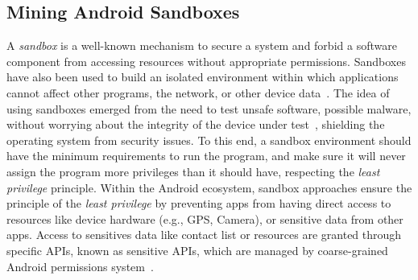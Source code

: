 \subsection{Mining Android Sandboxes}\label{sec:android-sandbox}

A \emph{sandbox}
is a well-known mechanism to secure a system and forbid a software component from accessing
resources without appropriate permissions. Sandboxes have also been used to build an isolated
environment within which applications cannot affect other programs, the network, or other device
data~\cite{DBLP:journals/peerj-cs/MaassSCS16}. The idea of using sandboxes emerged from the
need to test unsafe software, possible malware, without worrying about the integrity of the
device under test~\cite{DBLP:conf/esorics/BordoniCS17}, shielding the operating system from security issues.
To this end, a sandbox environment should have the minimum requirements to run the
program, and make sure it will never assign the program more privileges than it should have,
respecting the \emph{least privilege} principle.
Within the Android ecosystem, sandbox approaches ensure the principle
of the \emph{least privilege} by preventing apps from having direct access to resources like device hardware (e.g., GPS, Camera), or sensitive data from other apps. Access to sensitives data
like contact list or resources are granted through specific APIs, known as sensitive APIs, which are managed by coarse-grained Android permissions system~\cite{DBLP:journals/corr/abs-2109-06613}.




